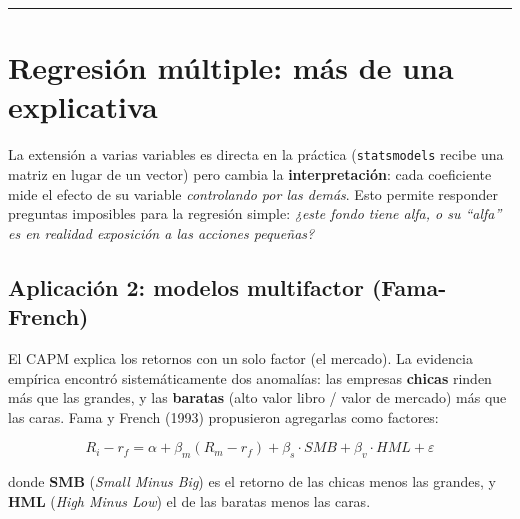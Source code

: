 \documentclass[
  spanish,
  letterpaper,
  DIV=11,
  numbers=noendperiod]{scrreprt}
\begin{document}
\begin{center}\rule{0.5\linewidth}{0.5pt}\end{center}

\chapter{Regresión múltiple: más de una
explicativa}\label{regresiuxf3n-muxfaltiple-muxe1s-de-una-explicativa}

La extensión a varias variables es directa en la práctica
(\texttt{statsmodels} recibe una matriz en lugar de un vector) pero
cambia la \textbf{interpretación}: cada coeficiente mide el efecto de su
variable \emph{controlando por las demás}. Esto permite responder
preguntas imposibles para la regresión simple: \emph{¿este fondo tiene
alfa, o su ``alfa'' es en realidad exposición a las acciones pequeñas?}

\section{Aplicación 2: modelos multifactor
(Fama-French)}\label{aplicaciuxf3n-2-modelos-multifactor-fama-french}

El CAPM explica los retornos con un solo factor (el mercado). La
evidencia empírica encontró sistemáticamente dos anomalías: las empresas
\textbf{chicas} rinden más que las grandes, y las \textbf{baratas} (alto
valor libro / valor de mercado) más que las caras. Fama y French (1993)
propusieron agregarlas como factores:

\[R_i - r_f = \alpha + \beta_m (R_m - r_f) + \beta_s \cdot SMB + \beta_v \cdot HML + \varepsilon\]

donde \textbf{SMB} (\emph{Small Minus Big}) es el retorno de las chicas
menos las grandes, y \textbf{HML} (\emph{High Minus Low}) el de las
baratas menos las caras.
\end{document}
